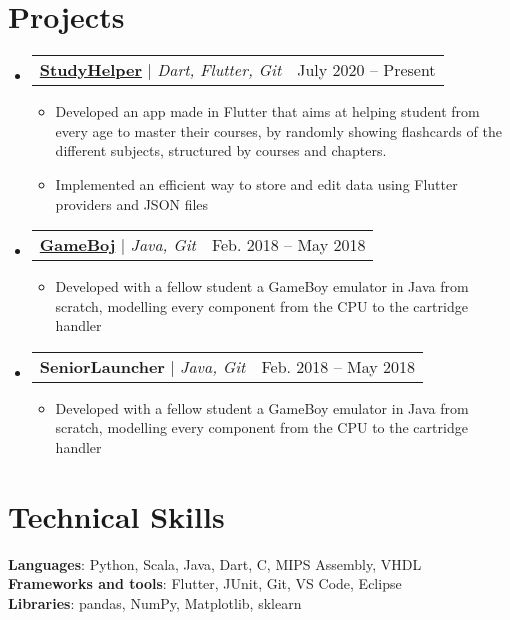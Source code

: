 \documentclass[letterpaper,11pt]{article}
\makeatletter
\newcommand{\resumeItem}[1]{
  \item\small{
    {#1 \vspace{-2pt}}
  }
}
\newcommand{\resumeProjectHeading}[2]{
    \item
    \begin{tabular*}{0.97\textwidth}{l@{\extracolsep{\fill}}r}
      \small#1 & #2 \\
    \end{tabular*}\vspace{-7pt}
}
\newcommand{\resumeSubHeadingListStart}{\begin{itemize}[leftmargin=0.15in, label={}]}
\newcommand{\resumeSubHeadingListEnd}{\end{itemize}}
\newcommand{\resumeItemListStart}{\begin{itemize}}
\newcommand{\resumeItemListEnd}{\end{itemize}\vspace{-5pt}}
\makeatother
\begin{document}
\section{Projects}
    \resumeSubHeadingListStart
        \resumeProjectHeading
          {\href{https://github.com/ClementSicard/StudyHelper}{\textbf{StudyHelper}} $|$ \emph{Dart, Flutter, Git}}{July 2020 -- Present}
          \resumeItemListStart
            \resumeItem{Developed an app made in Flutter that aims at helping student from every age to master their courses, by randomly showing flashcards of the different subjects, structured by courses and chapters.}
            \resumeItem{Implemented an efficient way to store and edit data using Flutter providers and JSON files}
          \resumeItemListEnd
      \resumeProjectHeading
          {\href{https://github.com/ClementSicard/GameBoj}{\textbf{GameBoj}} $|$ \emph{Java, Git}}{Feb. 2018 -- May 2018}
          \resumeItemListStart
            \resumeItem{Developed with a fellow student a GameBoy emulator in Java from scratch, modelling every component from the CPU to the cartridge handler}
          \resumeItemListEnd
    
    \resumeProjectHeading
          {\textbf{SeniorLauncher} $|$ \emph{Java, Git}}{Feb. 2018 -- May 2018}
          \resumeItemListStart
            \resumeItem{Developed with a fellow student a GameBoy emulator in Java from scratch, modelling every component from the CPU to the cartridge handler}
          \resumeItemListEnd
    \resumeSubHeadingListEnd




%
\section{Technical Skills}
 \begin{itemize}[leftmargin=0.15in, label={}]
    \small{\item{
     \textbf{Languages}{: Python, Scala, Java, Dart, C, MIPS Assembly, VHDL} \\
     \textbf{Frameworks and tools}{: Flutter, JUnit, Git, VS Code, Eclipse} \\
     \textbf{Libraries}{: pandas, NumPy, Matplotlib, sklearn}
    }}
 \end{itemize}
\end{document}

